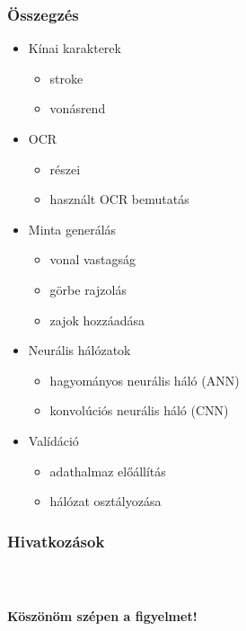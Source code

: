 \documentclass{beamer}
\begin{document}
\begin{frame}[fragile]
\frametitle{Összegzés}
\begin{itemize}
\item Kínai karakterek
	\begin{itemize}
	\item stroke
	\item vonásrend
	\end{itemize}
\item OCR
	\begin{itemize}
	\item részei
	\item használt OCR bemutatás
	\end{itemize}
\item Minta generálás
	\begin{itemize}
	\item vonal vastagság
	\item görbe rajzolás
	\item zajok hozzáadása
	\end{itemize}
\item Neurális hálózatok
	\begin{itemize}
	\item hagyományos neurális háló (ANN)
	\item konvolúciós neurális háló (CNN)
	\end{itemize}
\item Valídáció
	\begin{itemize}
	\item adathalmaz előállítás
	\item hálózat osztályozása
	\end{itemize}
\end{itemize}

\end{frame}


\begin{frame}[fragile]
\frametitle{Hivatkozások}


\end{frame}

\begin{frame}[fragile]
    \frametitle{\ }

\begin{center}
\Large \textbf{Köszönöm szépen a figyelmet!}
\end{center}

\end{frame}
\end{document}
